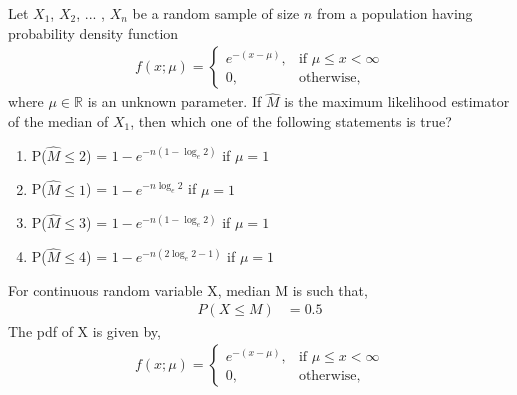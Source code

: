 \documentclass[]{article}
\begin{document}
\providecommand{\qfunc}[1]{\ensuremath{Q\left(#1\right)}}
\providecommand{\gauss}[2]{\mathcal{N}\ensuremath{\left(#1,#2\right)}}
\providecommand{\diff}[2]{\ensuremath{\frac{d{#1}}{d{#2}}}}
\providecommand{\myceil}[1]{\left \lceil #1 \right \rceil }
\newcommand\figref{Fig.~\ref}
\newcommand\tabref{Table~\ref}
\newcommand{\sinc}{\,\text{sinc}\,}
\newcommand{\rect}{\,\text{rect}\,}

\let\vec\mathbf

Let $X_1$, $X_2$, ... , $X_n$ be a random sample of size $n$ from a population having probability density function
\begin{align}
f(x; \mu) =
\begin{cases}
e^{-(x-\mu)}, & \text{if } \mu \leq x < \infty \\
0, & \text{otherwise,} 
\end{cases}
\end{align}
where $\mu \in \mathbb{R}$ is an unknown parameter. If $\hat{M}$ is the maximum likelihood estimator of the median of $X_1$, then which one of the following statements is true?
\begin{enumerate}[label=\Alph*)]
  \item P($\hat{M} \leq 2$) = $1 - e^{-n(1-\log_e 2)}$ if $\mu = 1$
  \item P($\hat{M} \leq 1$) = $1 - e^{-n \log_e 2}$ if $\mu = 1$
  \item P($\hat{M} \leq 3$) = $1 - e^{-n(1-\log_e 2)}$ if $\mu = 1$
  \item P($\hat{M} \leq 4$) = $1 - e^{-n(2\log_e 2-1)}$ if $\mu = 1$
\end{enumerate}
\solution
For continuous random variable X, median M is such that,
\begin{align}
P(X \leq M) &= 0.5
\end{align}
The pdf of X is given by,
\begin{align}
f(x; \mu) =
\begin{cases}
e^{-(x-\mu)}, & \text{if } \mu \leq x < \infty \\
0, & \text{otherwise,} 
\end{cases}
\end{align}
\end{document}
